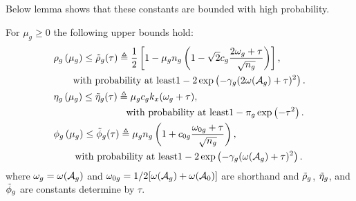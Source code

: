 Below lemma shows that these constants are bounded with high probability.  
\begin{lemma}
	\label{lemm:hpub}
	For $\mu_g \geq 0$ the following upper bounds hold:
	\begin{align}		
	\nr 
	&\rho_g\left(\mu_g\right) \leq \trho(\tau) \triangleq \frac{1}{2} \left[1 - \mu_g n_g \left(1 - \sqrt{2} c_g\frac{2 \omega_g + \tau}{ \sqrt{n_g}} \right)\right] , %
	\\ \nr 
	&\hspace*{20pt}\text{with probability at least} 1 - 2\exp\left( -\gamma_g (2\omega(\cA_g) + \tau)^2  \right).
	\\ \nr 
	&\eta_g\left(\mu_g\right) \leq \teta(\tau) \triangleq \mu_g c_g k_x (\omega_g + \tau), %
	\\ \nr 
	&\hspace*{75pt}\text{with probability at least} 1 - \pi_g \exp\left( -\tau^2 \right).
	\\ \nr 
	&\phi_g\left(\mu_g\right) \leq \tphi(\tau) \triangleq \mu_g n_g \left(1 + c_{0g}\frac{\omega_{0g} + \tau}{\sqrt{n_g}} \right), %
	\\ \nr 
	&\hspace*{22pt}\text{with probability at least} 1 - 2\exp\left( -\gamma_g (\omega(\cA_g) + \tau)^2  \right).
	\end{align} 
	where $\omega_g = \omega(\cA_g)$ and $\omega_{0g} = 1/2 [\omega(\cA_g) + \omega(\cA_0)]$ are shorthand and $\tilde{\rho}_g$, $\tilde{\eta}_g$, and $\tilde{\phi}_g$ are constants determine by $\tau$.
\end{lemma}
